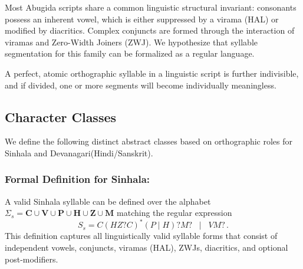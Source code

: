 Most Abugida scripts share a common linguistic structural invariant: consonants possess an inherent vowel, which is either suppressed by a virama (HAL) or modified by diacritics. Complex conjuncts are formed through the interaction of viramas and Zero-Width Joiners (ZWJ). We hypothesize that syllable segmentation for this family can be formalized as a regular language. 

\begin{definition}
A perfect, atomic orthographic syllable in a linguistic script is further indivisible, and if divided, one or more segments will become individually meaningless.
\end{definition}

\subsection{Character Classes}
We define the following distinct abstract classes based on orthographic roles for Sinhala and Devanagari(Hindi/Sanskrit).

\begin{table}[H]
\caption{Sinhala Unicode Character Class}
\label{tab:char_classes}
\begin{center}
\end{center}
\end{table}

\subsubsection{Formal Definition for Sinhala:}
A valid Sinhala syllable can be defined over the alphabet $\Sigma_s = \textbf{C} \cup \textbf{V} \cup \textbf{P} \cup \textbf{H} \cup \textbf{Z} \cup \textbf{M}$ matching the regular expression
\[
S_s = C (H Z? C)^* (P \mid H)? M? \;\;\mid\;\; V M? \,.
\]
This definition captures all linguistically valid syllable forms that consist of independent vowels, conjuncts, viramas (HAL), ZWJs, diacritics, and optional post-modifiers. 

